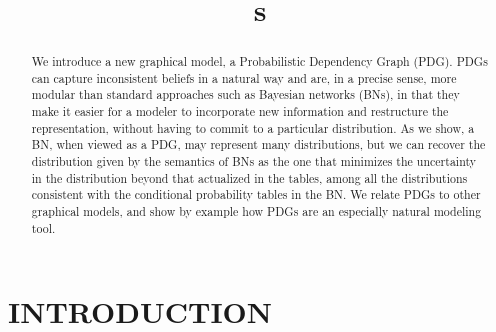 \documentclass{article}
\title{\ModelName s}
\author{} %
\newcommand{\commentout}[1]{\ignorespaces}
\newcommand{\ModelName}{Probabilistic Dependency Graph}
\newcommand{\modelname}{probabilistic dependency graph}
\newcommand{\MN}{PDG}
\numberwithin{equation}{section}
\begin{document}
	\maketitle
	
	\begin{abstract}
		We introduce a new graphical model, a Probabilistic Dependency Graph (PDG). PDGs can capture inconsistent beliefs in a natural way and are, in a precise sense, more modular than standard approaches such as Bayesian networks (BNs), in that they make it easier for a modeler to incorporate new information and restructure the representation, without having to commit to a particular distribution. As we show, a BN, when viewed as a PDG, may represent many distributions, but we can recover the distribution given by the semantics of BNs as the one that minimizes the uncertainty in the distribution beyond that actualized in the tables, among all the distributions consistent with the conditional probability tables in the BN. We relate PDGs to other graphical models, and show by example how PDGs are an especially natural modeling tool.
	\end{abstract}


	\section{INTRODUCTION}

	\commentout{We introduce the \ModelName\ (\MN), a directed graphical model for specifying local beliefs. They are strictly more expressive and modular than existing directed graphical models, and in particular this allows them represent inconsistent belief states.
	
	
	To be clear, inconsistencies are bad. Still, constantly examining every possible interaction between beliefs is taxing and restrictive, making them difficult to avoid: reasonable people are often simultaneously unaware of any inconsistencies in their beliefs, and yet still think it probable that they are not entirely consistent.%
		\footnote{In some sense, this is the reason arguments exist: it is possible to get a person to agree to premises and reject a conclusion, revealing inconsistency---inconsistency which can then be used to change someone else's mental state. }		
	Most graphical models eliminate the possibility of inconsistency by fiat, 
	making them poorly suited to representing inconsistent belief states.
	While we do not endorse inconsistency, we nonetheless think it important to represent: in addition to modeling an overwhelmingly common feature of humans, the possibility of inconsistency 
	allows our model (called a \modelname\ or \MN)
	to portray intermediate stages of belief updating (\Cref{sec:belief-update}), 
	provides a rationale for providing multiple justifications 
	(corroborating evidence means more in the presence of possible conflict; see \Cref{ex:corrob}),
	and	recasts standard algorithms such as belief propagation and conditioning on evidence as resolutions of inconsistency (\Cref{sec:algorithms}). }
\end{document}
